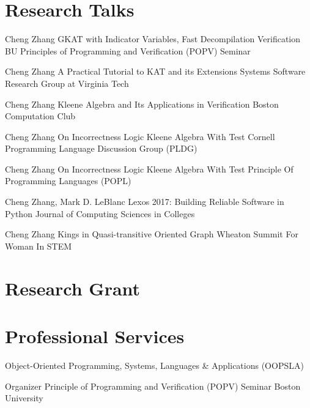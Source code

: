 \documentclass[10pt]{moderncv}        %
\let\oldsection=\section
\renewcommand{\section}{%
  \needspace{\baselineskip}
  \oldsection
}
\begin{document}
\section{Research Talks}

{Cheng Zhang}
{GKAT with Indicator Variables, Fast Decompilation Verification}
{BU Principles of Programming and Verification (POPV) Seminar}
{}{}

{Cheng Zhang}
{A Practical Tutorial to KAT and its Extensions}
{Systems Software Research Group at Virginia Tech}
{}{}

{Cheng Zhang}
{Kleene Algebra and Its Applications in Verification}
{Boston Computation Club}
{}{}

{Cheng Zhang}
{On Incorrectness Logic Kleene Algebra With Test}
{Cornell Programming Language Discussion Group (PLDG)}
{}{}

{Cheng Zhang}
{On Incorrectness Logic Kleene Algebra With Test}
{Principle Of Programming Languages (POPL)}
{}{}

{Cheng Zhang, Mark D. LeBlanc}
{Lexos 2017: Building Reliable Software in Python}
{Journal of Computing Sciences in Colleges}
{}{}

{Cheng Zhang}
{Kings in Quasi-transitive Oriented Graph}
{Wheaton Summit For Woman In STEM}
{}{}

\section{Research Grant}



\section{Professional Services}

{Object-Oriented Programming, Systems, Languages \& Applications (OOPSLA)}{}{}{}

{Organizer}
{Principle of Programming and Verification (POPV) Seminar}
{Boston University}{}
{%
}
\end{document}

